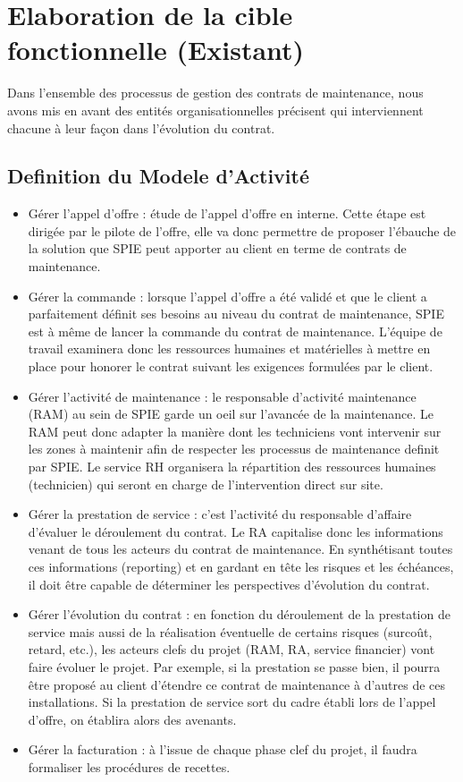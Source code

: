 \section{Elaboration de la cible fonctionnelle (Existant)}
Dans l'ensemble des processus de gestion des contrats de maintenance, nous avons mis en avant des entités organisationnelles précisent qui interviennent chacune à leur façon dans l'évolution du contrat.

\subsection{Definition du Modele d'Activité} 

\begin{itemize}
\item Gérer l'appel d'offre : étude de l'appel d'offre en interne. Cette étape est dirigée par le pilote de l'offre, elle va donc permettre de proposer l'ébauche de la solution que SPIE peut apporter au client en terme de contrats de maintenance.
\item Gérer la commande : lorsque l'appel d'offre a été validé et que le client a parfaitement définit ses besoins au niveau du contrat de maintenance, SPIE est à même de lancer la \og commande \fg du contrat de maintenance. L'équipe de travail examinera donc les ressources humaines et matérielles à mettre en place pour honorer le contrat suivant les exigences formulées par le client.
\item Gérer l'activité de maintenance : le responsable d'activité maintenance (RAM) au sein de SPIE garde un oeil sur l'avancée de la maintenance. Le RAM peut donc adapter la manière dont les techniciens vont intervenir sur les zones à maintenir afin de respecter les processus de maintenance definit par SPIE. Le service RH organisera la répartition des ressources humaines (technicien) qui seront en charge de l'intervention direct sur site.
\item Gérer la prestation de service : c'est l'activité du responsable d'affaire d'évaluer le déroulement du contrat. Le RA capitalise donc les informations venant de tous les acteurs du contrat de maintenance. En synthétisant toutes ces informations (reporting) et en gardant en tête les risques et les échéances, il doit être capable de déterminer les perspectives d'évolution du contrat.
\item Gérer l'évolution du contrat : en fonction du déroulement de la prestation de service mais aussi de la réalisation éventuelle de certains risques (surcoût, retard, etc.), les acteurs clefs du projet (RAM, RA, service financier) vont faire évoluer le projet. Par exemple, si la prestation se passe bien, il pourra être proposé au client d'étendre ce contrat de maintenance à d'autres de ces installations. Si la prestation de service sort du cadre établi lors de l'appel d'offre, on établira alors des avenants.
\item Gérer la facturation : à l'issue de chaque phase clef du projet, il faudra formaliser les procédures de recettes. 
\end{itemize}

